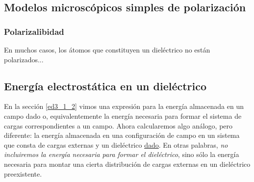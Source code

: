 \subsection{Modelos microscópicos simples de polarización}
\subsubsection{Polarizalibidad}
En muchos casos, los átomos que constituyen un dieléctrico no están polarizados...

\subsection{Energía electrostática en un dieléctrico}

En la sección \ref{ed3_1_2} vimos una expresión para la energía almacenada
en un campo dado o, equivalentemente la energía necesaria para formar el
sistema de cargas correspondientes a un campo. Ahora calcularemos algo
análogo, pero diferente: la energía almacenada en una configuración de campo
en un sistema que consta de cargas externas y un dieléctrico \underline{dado}.
En otras palabras, \textit{no incluiremos la energía necesaria para formar el
dieléctrico}, sino sólo la energía necesaria para montar una cierta
distribución de cargas externas en un dieléctrico preexistente.

